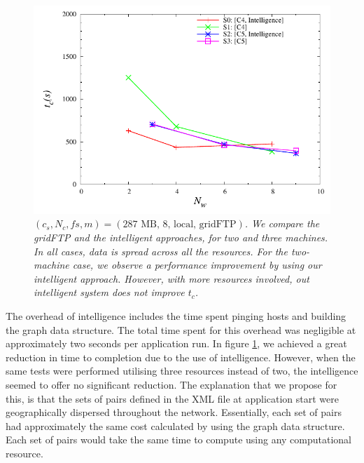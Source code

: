 \documentclass{rspublic}
\newcommand{\micnote}[1]{ {\textcolor{blue} { ***Michael: #1 }}}
\newcommand{\betynote}[1]{ {\textcolor{orange} { ***Bety: #1 }}}
\newcommand{\jhanote}[1]{} \newcommand{\micnote}[1]{}\newcommand{\betynote}[1]{} \newcommand{\fixme}[1]{}
\begin{document}

\begin{figure}[!ht]
\begin{center}
   \includegraphics[scale=0.5] {data/graphs/IntelligentFigure}
\end{center}
\caption{\textit{$(c_s, N_c, fs, m)=(\mbox{287 MB, 8, local, gridFTP})$. We compare the gridFTP and the intelligent approaches, for two and three machines. In all cases, data is spread across all the resources.  For the two-machine case, we observe a performance improvement by using our intelligent approach. However, with more resources involved, out intelligent system does not improve $t_c$.}}
\label{Fig:IntelligentExp}
\end{figure}


The overhead of intelligence includes the time spent pinging hosts and
building the graph data structure. The total time spent for this
overhead was negligible at approximately two seconds per application
run. In figure \ref{Fig:IntelligentExp}, we achieved a great reduction
in time to completion due to the use of intelligence.  However, when the
same tests were performed utilising three resources instead of two, the
intelligence seemed to offer no significant reduction. The explanation
that we propose for this, is that the sets of pairs defined in the XML
file at application start were geographically dispersed throughout the
network.  Essentially, each set of pairs had approximately the same cost
calculated by using the graph data structure. Each set of pairs would
take the same time to compute using any computational resource.
\jhanote{Perhaps define a test to verify this, so a note can go in
saying we investigated this}
\end{document}
